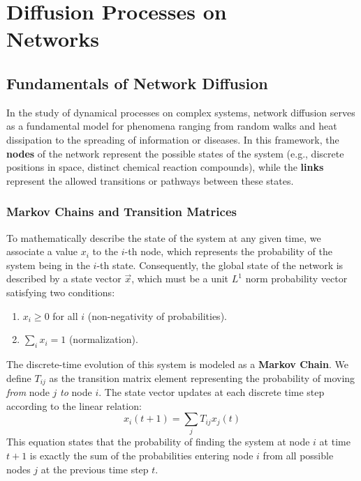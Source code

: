 \chapter[Diffusion Processes on Networks]{Diffusion Processes on\\Networks}

\section{Fundamentals of Network Diffusion}

In the study of dynamical processes on complex systems, network diffusion serves as a fundamental model for phenomena ranging from random walks and heat dissipation to the spreading of information or diseases. In this framework, the \textbf{nodes} of the network represent the possible states of the system (e.g., discrete positions in space, distinct chemical reaction compounds), while the \textbf{links} represent the allowed transitions or pathways between these states.

\subsection{Markov Chains and Transition Matrices}

To mathematically describe the state of the system at any given time, we associate a value $x_i$ to the $i$-th node, which represents the probability of the system being in the $i$-th state. Consequently, the global state of the network is described by a state vector $\vec{x}$, which must be a unit $L^1$ norm probability vector satisfying two conditions:
\begin{enumerate}
    \item $x_i \ge 0$ for all $i$ (non-negativity of probabilities).
    \item $\sum_i x_i = 1$ (normalization).
\end{enumerate}

The discrete-time evolution of this system is modeled as a \textbf{Markov Chain}. We define $T_{ij}$ as the transition matrix element representing the probability of moving \textit{from} node $j$ \textit{to} node $i$. The state vector updates at each discrete time step according to the linear relation:
\[
    x_i(t+1) = \sum_{j} T_{ij} x_j(t)
\]
This equation states that the probability of finding the system at node $i$ at time $t+1$ is exactly the sum of the probabilities entering node $i$ from all possible nodes $j$ at the previous time step $t$.

